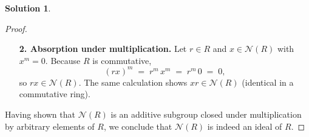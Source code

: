 \documentclass[12pt]{article}
\theoremstyle{definition} %
\newtheorem{solution}{Solution}
\theoremstyle{plain} %
\begin{document}
\begin{solution}
\begin{proof}
\begin{enumerate}
      \item[\textbf{2.  Absorption under multiplication.}]
            Let $r\in R$ and $x\in\mathcal{N}(R)$ with $x^{m}=0$.  
            Because $R$ is commutative,
            \[
                (rx)^{m} \;=\; r^{m}\,x^{m} \;=\; r^{m}\,0 \;=\; 0,
            \]
            so $rx\in\mathcal{N}(R)$.  
            The same calculation shows $xr\in\mathcal{N}(R)$ (identical in a commutative ring).

  \end{enumerate}
  Having shown that $\mathcal{N}(R)$ is an additive subgroup closed under multiplication by arbitrary elements of $R$, we conclude that $\mathcal{N}(R)$ is indeed an ideal of $R$.
\end{proof} 
\end{solution}
\end{document}
